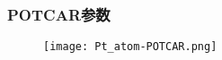 \frame
{
	\frametitle{\textrm{POTCAR}参数}
\begin{figure}[h!]
\centering
\texttt{[image: Pt\_atom-POTCAR.png]}
\caption{\fontsize{6.2pt}{5.2pt}}%
\label{Pt_atom:POTCAR}
\end{figure}
}
